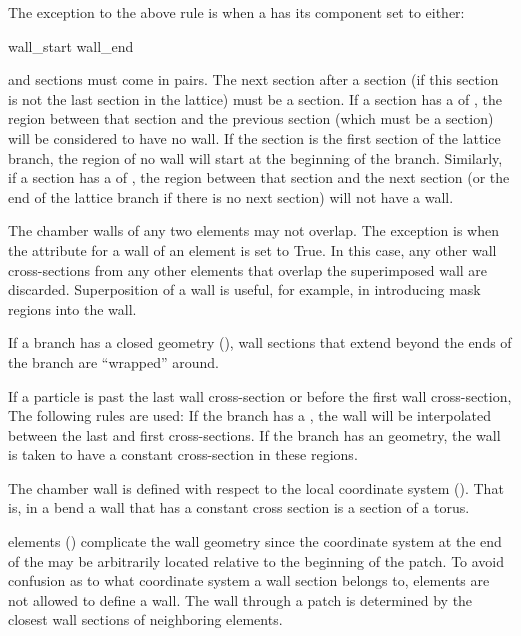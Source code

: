 The exception to the above rule is when a  has its
 component set to either:
\begin{example}
  wall_start
  wall_end
\end{example}
 and  sections must come in pairs. The next section after a
 section (if this section is not the last section in the lattice) must be a
 section.  If a section has a  of , the region between that
section and the previous section (which must be a  section) will be considered to have
no wall. If the  section is the first section of the lattice branch, the region of no
wall will start at the beginning of the branch. Similarly, if a section has a  of
, the region between that section and the next section (or the end of the lattice
branch if there is no next section) will not have a wall.

The chamber walls of any two elements may not overlap. The exception is when the 
attribute for a wall of an element is set to True. In this case, any other wall cross-sections from
any other elements that overlap the superimposed wall are discarded.  Superposition of a wall is
useful, for example, in introducing mask regions into the wall.

If a branch has a closed geometry (), wall sections that extend beyond the ends of the
branch are ``wrapped'' around.

If a particle is past the last wall cross-section or before the first wall cross-section, The
following rules are used: If the branch has a , the wall will be interpolated
between the last and first cross-sections. If the branch has an  geometry, the wall is
taken to have a constant cross-section in these regions.

The chamber wall is defined with respect to the local coordinate system (). That is, in
a bend a wall that has a constant cross section is a section of a torus.

 elements () complicate the wall geometry since the coordinate system at the
end of the  may be arbitrarily located relative to the beginning of the patch. To avoid
confusion as to what coordinate system a wall section belongs to,  elements are not
allowed to define a wall. The wall through a patch is determined by the closest wall sections of
neighboring elements.


